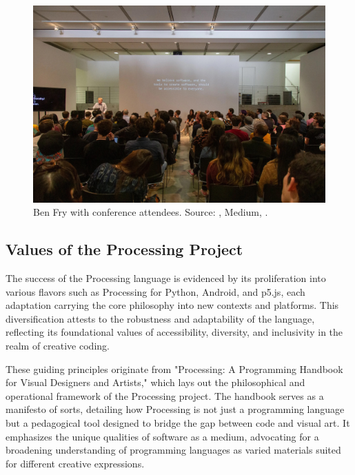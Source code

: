   \begin{figure}[h]
    \centering
    \includegraphics[width=1\textwidth]{images/pcd_la_2019.jpeg}
    \caption[Ben Fry at PCD 2018]{Ben Fry with conference attendees. Source: , Medium, \citeyear{guptaBenFryConference2018}.}
  \end{figure}
  
\subsection{Values of the Processing Project}

The success of the Processing language is evidenced by its proliferation into various flavors such as Processing for Python, Android, and p5.js, each adaptation carrying the core philosophy into new contexts and platforms. This diversification attests to the robustness and adaptability of the language, reflecting its foundational values of accessibility, diversity, and inclusivity in the realm of creative coding.

These guiding principles originate from "Processing: A Programming Handbook for Visual Designers and Artists,"\parencite{reasProcessingProgrammingHandbook2007a} which lays out the philosophical and operational framework of the Processing project. The handbook serves as a manifesto of sorts, detailing how Processing is not just a programming language but a pedagogical tool designed to bridge the gap between code and visual art. It emphasizes the unique qualities of software as a medium, advocating for a broadening understanding of programming languages as varied materials suited for different creative expressions.

